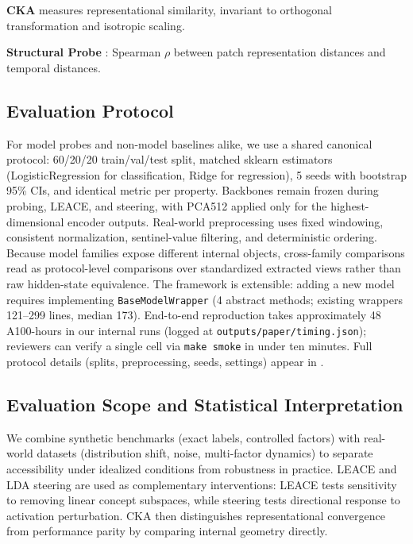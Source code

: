 \documentclass{article}
\begin{document}
\textbf{CKA} \cite{Kornblith2019} measures representational similarity, invariant to orthogonal transformation and isotropic scaling.

\textbf{Structural Probe} \cite{HewittManning2019}: Spearman $\rho$ between patch representation distances and temporal distances.

\subsection{Evaluation Protocol}

For model probes and non-model baselines alike, we use a shared canonical protocol: 60/20/20 train/val/test split, matched sklearn estimators (LogisticRegression for classification, Ridge for regression), 5 seeds with bootstrap 95\% CIs, and identical metric per property. Backbones remain frozen during probing, LEACE, and steering, with PCA512 applied only for the highest-dimensional encoder outputs. Real-world preprocessing uses fixed windowing, consistent normalization, sentinel-value filtering, and deterministic ordering. Because model families expose different internal objects, cross-family comparisons read as protocol-level comparisons over standardized extracted views rather than raw hidden-state equivalence. The framework is extensible: adding a new model requires implementing \texttt{BaseModelWrapper} (4 abstract methods; existing wrappers 121--299 lines, median 173). End-to-end reproduction takes approximately 48 A100-hours in our internal runs (logged at \texttt{outputs/paper/timing.json}); reviewers can verify a single cell via \texttt{make smoke} in under ten minutes. Full protocol details (splits, preprocessing, seeds, settings) appear in .

\subsection{Evaluation Scope and Statistical Interpretation}

We combine synthetic benchmarks (exact labels, controlled factors) with real-world datasets (distribution shift, noise, multi-factor dynamics) to separate accessibility under idealized conditions from robustness in practice. LEACE and LDA steering are used as complementary interventions: LEACE tests sensitivity to removing linear concept subspaces, while steering tests directional response to activation perturbation. CKA then distinguishes representational convergence from performance parity by comparing internal geometry directly.
\end{document}
